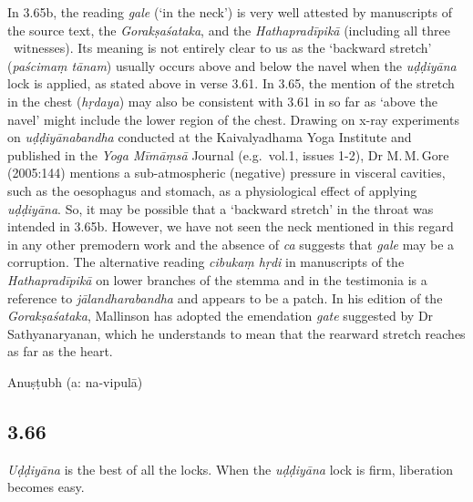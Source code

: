 \begin{ekdosis}
\begin{philcomm}[hp03_065]
In 3.65b, the reading \emph{gale} (`in the neck') is very well attested by manuscripts of the source text, the \emph{Gorakṣaśataka}, and the \emph{Hathapradīpikā} (including all three \textalpha\ witnesses). Its meaning is not entirely clear to us as the `backward stretch' (\emph{paścimaṃ tānam}) usually occurs above and below the navel when the \emph{uḍḍiyāna} lock is applied, as stated above in verse 3.61. In 3.65, the mention of the stretch in the chest (\emph{hṛdaya}) may also be consistent with 3.61 in so far as `above the navel' might include the lower region of the chest. Drawing on x-ray experiments on \emph{uḍḍiyānabandha} conducted at the Kaivalyadhama Yoga Institute and published in the \emph{Yoga Mīmāṃsā} Journal (e.g.~vol.1, issues 1-2), Dr M.\,M.\,Gore (2005:144) mentions a sub-atmospheric (negative) pressure in visceral cavities, such as the oesophagus and stomach, as a physiological effect of applying \emph{uḍḍiyāna}. So, it may be possible that a `backward stretch' in the throat was intended in 3.65b. However, we have not seen the neck mentioned in this regard in any other premodern work and the absence of \emph{ca} suggests that \emph{gale} may be a corruption. The alternative reading \emph{cibukaṃ hṛdi} in manuscripts of the \emph{Hathapradīpikā} on lower branches of the stemma and in the testimonia is a reference to \emph{jālandharabandha} and appears to be a patch. In his edition of the \emph{Gorakṣaśataka}, Mallinson has adopted the emendation \emph{gate} suggested by Dr Sathyanaryanan, which he understands to mean that the rearward stretch reaches as far as the heart. 
\end{philcomm}

\begin{metre}[hp03_065]
Anuṣṭubh (a: na-vipulā)
\end{metre}

\subsection*{3.66}
\begin{translation}[hp03_066]
\emph{Uḍḍiyāna} is the best of all the locks. When the \emph{uḍḍiyāna} lock is firm, liberation becomes easy.
\end{translation}


\end{ekdosis}
